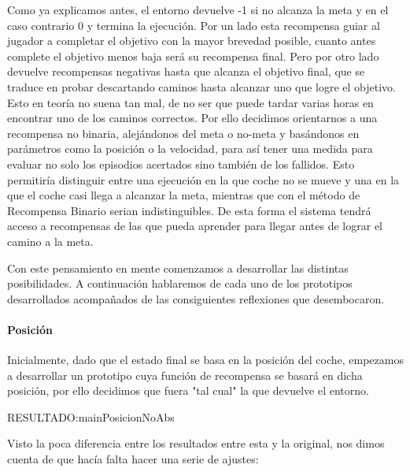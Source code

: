 Como ya explicamos antes, el entorno devuelve -1 si no alcanza la meta y en el caso contrario 0 y termina la ejecución. 
Por un lado esta recompensa guiar al jugador a completar el objetivo con la mayor brevedad posible, cuanto antes complete el objetivo menos baja será su recompensa final.
Pero por otro lado devuelve recompensas negativas hasta que alcanza el objetivo final, que se traduce en probar descartando caminos hasta alcanzar uno que logre el objetivo. Esto en teoría no suena tan mal, de no ser que puede tardar varias horas en encontrar uno de los caminos correctos. Por ello decidimos orientarnos a una recompensa no binaria, alejándonos del meta o no-meta y basándonos en parámetros como la posición o la velocidad, para así tener una medida para evaluar no solo los episodios acertados sino también de los fallidos. Esto permitiría distinguir entre una ejecución en la que coche no se mueve y una en la que el coche casi llega a alcanzar la meta, mientras que con el método de Recompensa Binario serian indistinguibles. De esta forma el sistema tendrá acceso a recompensas de las que pueda aprender para llegar antes de lograr el camino a la meta. 

Con este pensamiento en mente comenzamos a desarrollar las distintas posibilidades. A continuación hablaremos de cada uno de los prototipos desarrollados acompañados de las consiguientes reflexiones que desembocaron.
 
\paragraph{Posición}
Inicialmente, dado que el estado final se basa en la posición del coche, empezamos a desarrollar un prototipo cuya función de recompensa se basará en dicha posición, por ello decidimos que fuera "tal cual" la que devuelve el entorno. 

 RESULTADO:mainPosicionNoAbs

Visto la poca diferencia entre los resultados entre esta y la original, nos dimos cuenta de que hacía falta hacer una serie de ajustes:

